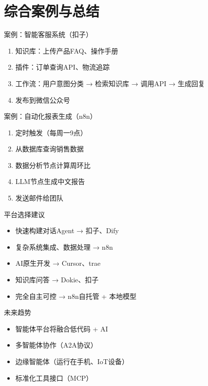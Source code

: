 \section{综合案例与总结}

\begin{frame}{案例：智能客服系统（扣子）}
\begin{enumerate}
\item 知识库：上传产品FAQ、操作手册
\item 插件：订单查询API、物流追踪
\item 工作流：用户意图分类 → 检索知识库 → 调用API → 生成回复
\item 发布到微信公众号
\end{enumerate}
\end{frame}

\begin{frame}{案例：自动化报表生成（n8n）}
\begin{enumerate}
\item 定时触发（每周一9点）
\item 从数据库查询销售数据
\item 数据分析节点计算周环比
\item LLM节点生成中文报告
\item 发送邮件给团队
\end{enumerate}
\end{frame}

\begin{frame}{平台选择建议}
\begin{itemize}
\item 快速构建对话Agent → 扣子、Dify
\item 复杂系统集成、数据处理 → n8n
\item AI原生开发 → Cursor、trae
\item 知识库问答 → Dokie、扣子
\item 完全自主可控 → n8n自托管 + 本地模型
\end{itemize}
\end{frame}

\begin{frame}{未来趋势}
\begin{itemize}
\item 智能体平台将融合低代码 + AI
\item 多智能体协作（A2A协议）
\item 边缘智能体（运行在手机、IoT设备）
\item 标准化工具接口（MCP）
\end{itemize}
\end{frame}

